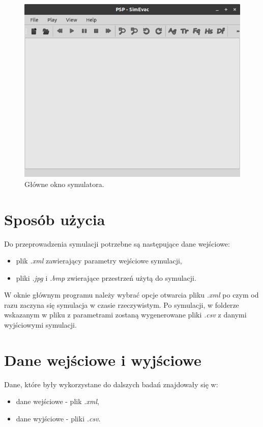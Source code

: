 \documentclass[12pt]{aghdpl}
\newenvironment{tightcenter}{
  \setlength\topsep{0pt}
  \setlength\parskip{0pt}
  \begin{center}
}{
  \end{center}
}
\begin{document}
		\begin{figure}[h]
	 		\begin{tightcenter}
	 			\includegraphics[width = 0.75\linewidth]{rysunki/symulator.png}
	 		\end{tightcenter}
	 		
			\caption{Główne okno symulatora.}
			\label{fig: glowne_okno_symulatora}
		\end{figure}
	
		\section{Sposób użycia}
		Do przeprowadzenia symulacji potrzebne są następujące dane wejściowe:
		\begin{itemize}
		\item plik \textit{.xml} zawierający parametry wejściowe symulacji,
		\item pliki \textit{.jpg} i \textit{.bmp} zwierające przestrzeń użytą do symulacji.
		\end{itemize}
	
		W oknie głównym programu należy wybrać opcje otwarcia pliku \textit{.xml} po czym od razu zaczyna się symulacja w czasie rzeczywistym. Po symulacji, w folderze wskazanym w pliku z parametrami zostaną wygenerowane pliki \textit{.csv} z danymi wyjściowymi symulacji.
		
		\section{Dane wejściowe i wyjściowe}
		Dane, które były wykorzystane do dalszych badań znajdowały się w:
		\begin{itemize}
		\item dane wejściowe - plik \textit{.xml},
		\item dane wyjściowe - pliki \textit{.csv}.
		\end{itemize}
		
\end{document}
